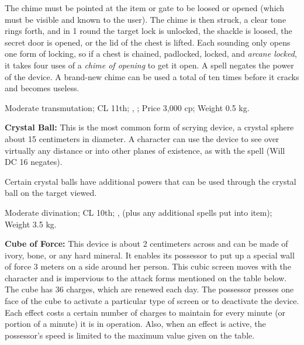 The chime must be pointed at the item or gate to be loosed or opened (which must be visible and known to the user). The chime is then struck, a clear tone rings forth, and in 1 round the target lock is unlocked, the shackle is loosed, the secret door is opened, or the lid of the chest is lifted. Each sounding only opens one form of locking, so if a chest is chained, padlocked, locked, and \emph{arcane locked}, it takes four uses of a \emph{chime of opening} to get it open. A  spell negates the power of the device. A brand-new chime can be used a total of ten times before it cracks and becomes useless.

Moderate transmutation; CL 11th; , ; Price 3,000 cp; Weight 0.5 kg.



\textbf{Crystal Ball:} This is the most common form of scrying device, a crystal sphere about 15 centimeters in diameter. A character can use the device to see over virtually any distance or into other planes of existence, as with the spell  (Will DC 16 negates).

Certain crystal balls have additional powers that can be used through the crystal ball on the target viewed.


Moderate divination; CL 10th; ,  (plus any additional spells put into item); Weight 3.5 kg.



\textbf{Cube of Force:} This device is about 2 centimeters across and can be made of ivory, bone, or any hard mineral. It enables its possessor to put up a special wall of force 3 meters on a side around her person. This cubic screen moves with the character and is impervious to the attack forms mentioned on the table below. The cube has 36 charges, which are renewed each day. The possessor presses one face of the cube to activate a particular type of screen or to deactivate the device. Each effect costs a certain number of charges to maintain for every minute (or portion of a minute) it is in operation. Also, when an effect is active, the possessor's speed is limited to the maximum value given on the table.

